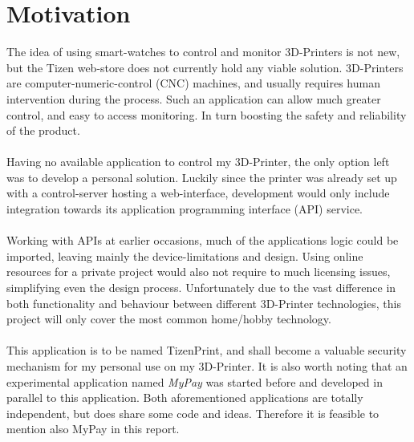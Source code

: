 \documentclass[a4paper, 12pt]{article}
\newcommand{\mysection}[1]{\section*{#1} \addcontentsline{toc}{section}{#1}}
\begin{document}
    \mysection{Motivation}
    The idea of using smart-watches to control and monitor 3D-Printers is not new, but the Tizen web-store does not
    currently hold any viable solution.
    3D-Printers are computer-numeric-control (CNC) machines, and usually requires human intervention during the
    process.
    Such an application can allow much greater control, and easy to access monitoring.
    In turn boosting the safety and reliability of the product.
    \\\\
    Having no available application to control my 3D-Printer, the only option left was to develop a personal
    solution.
    Luckily since the printer was already set up with a control-server hosting a web-interface, development would only
    include integration towards its application programming interface (API) service.
    \\\\
    Working with APIs at earlier occasions, much of the applications logic could be imported, leaving mainly the
    device-limitations and design.
    Using online resources for a private project would also not require to much licensing issues, simplifying even the
    design process.
    Unfortunately due to the vast difference in both functionality and behaviour between different 3D-Printer
    technologies, this project will only cover the most common home/hobby technology.
    \\\\
    This application is to be named TizenPrint, and shall become a valuable security mechanism for my personal use
    on my 3D-Printer.
    It is also worth noting that an experimental application named \textit{MyPay} was started before and developed
    in parallel to this application.
    Both aforementioned applications are totally independent, but does share some code and ideas.
    Therefore it is feasible to mention also MyPay in this report.

    \newpage
\end{document}

